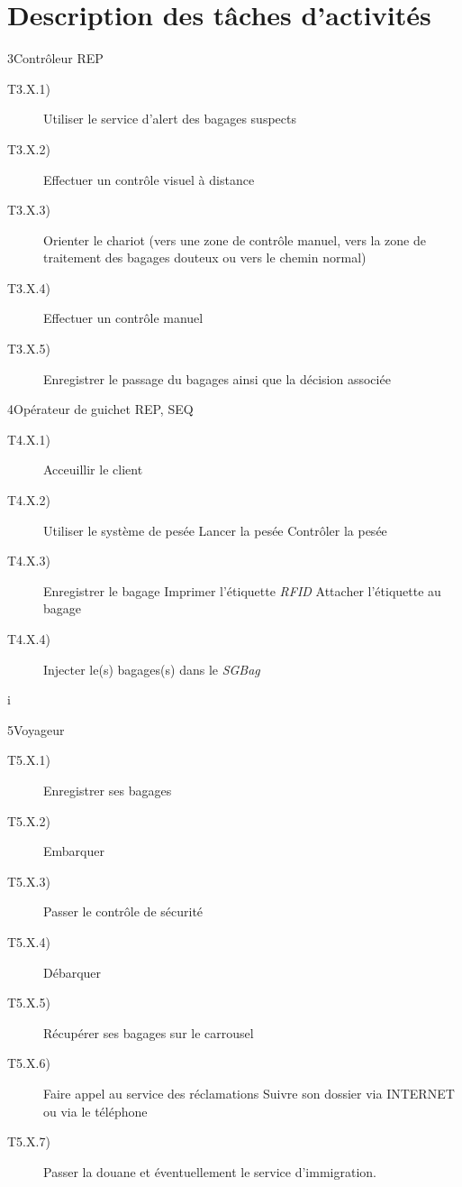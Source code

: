 \part{Description des tâches d'activités}

\dta
{3}{Contrôleur}
{REP}
{
\begin{description}
	\item [T3.X.1)] Utiliser le service d'alert des bagages suspects
	\item [T3.X.2)] Effectuer un contrôle visuel à distance
	\item [T3.X.3)] Orienter le chariot (vers une zone de contrôle manuel, vers la zone de traitement des bagages douteux ou vers le chemin \og normal\fg)
	\item [T3.X.4)] Effectuer un contrôle manuel
	\item [T3.X.5)] Enregistrer le passage du bagages ainsi que la décision associée	
\end{description}
}

\dta
{4}{Opérateur de guichet}
{REP, SEQ}
{
\begin{description}
	\item [T4.X.1)] Acceuillir le client
	\item [T4.X.2)] Utiliser le système de pesée
		\subitem [T4.X.2.1)] Lancer la pesée
		\subitem [T4.X.2.1)] Contrôler la pesée

	\item [T4.X.3)] Enregistrer le bagage
		\subitem [T4.X.3.1] Imprimer l'étiquette \textsl{RFID}
		\subitem [T4.X.3.1] Attacher l'étiquette au bagage
		
	\item [T4.X.4)] Injecter le(s) bagages(s) dans le \textsl{SGBag} 
\end{description}
}i

\dta
{5}{Voyageur}
{
\begin{description}
	\item [T5.X.1)] Enregistrer ses bagages
	\item [T5.X.2)] Embarquer
	\item [T5.X.3)] Passer le contrôle de sécurité
	\item [T5.X.4)] Débarquer
	\item [T5.X.5)] Récupérer ses bagages sur le carrousel
	\item [T5.X.6)] Faire appel au service des réclamations
		\subitem [T5.X.6.1)] Suivre son dossier via INTERNET ou via le téléphone
	\item [T5.X.7)] Passer la douane et éventuellement le service d'immigration.
\end{description}
}

